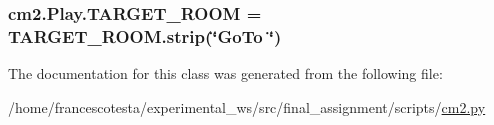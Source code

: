 \subsubsection[{\texorpdfstring{T\+A\+R\+G\+E\+T\+\_\+\+R\+O\+OM}{TARGET_ROOM}}]{\setlength{\rightskip}{0pt plus 5cm}cm2.\+Play.\+T\+A\+R\+G\+E\+T\+\_\+\+R\+O\+OM = T\+A\+R\+G\+E\+T\+\_\+\+R\+O\+O\+M.\+strip(\char`\"{}Go\+To \char`\"{})\hspace{0.3cm}{\ttfamily [static]}}\hypertarget{classcm2_1_1Play_a04801b2166d02c4d58ad8a12ec71dafd}{}\label{classcm2_1_1Play_a04801b2166d02c4d58ad8a12ec71dafd}


The documentation for this class was generated from the following file\+:\begin{DoxyCompactItemize}
\item 
/home/francescotesta/experimental\+\_\+ws/src/final\+\_\+assignment/scripts/\hyperlink{cm2_8py}{cm2.\+py}\end{DoxyCompactItemize}
